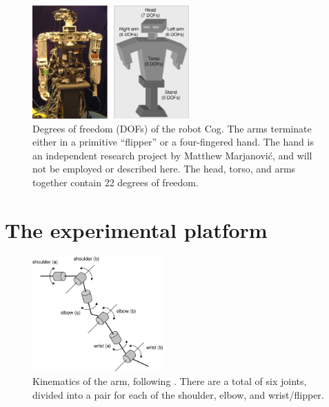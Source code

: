 
\begin{figure}[tbh]
\centerline{
\includegraphics[width=6.0cm]{cog-schematic.eps}
}
\caption{ 
%
  Degrees of freedom (DOFs) of the robot Cog.  The arms terminate
  either in a primitive ``flipper'' or a four-fingered hand.  
\ifverbose
The hand
  is an independent research project by Matthew Marjanovi\'{c}, and
  will not be employed or described here.  
\fi
  The head, torso, and arms
  together contain 22 degrees of freedom.
%
}
\label{fig:cog-schematic}
\end{figure}

\section{The experimental platform}



\ifverbose
%
\begin{figure}[tbh]
\begin{center}
\includegraphics[width=5.0cm]{arm-motors.eps}
\caption{ 
\label{fig:arm-motors}
%
Kinematics of the arm, following \protect\cite{williamson99robot}.
There are a total of six joints, divided into a pair for each of
the shoulder, elbow, and wrist/flipper.
%
}
\end{center}
\end{figure}
%
\fi

